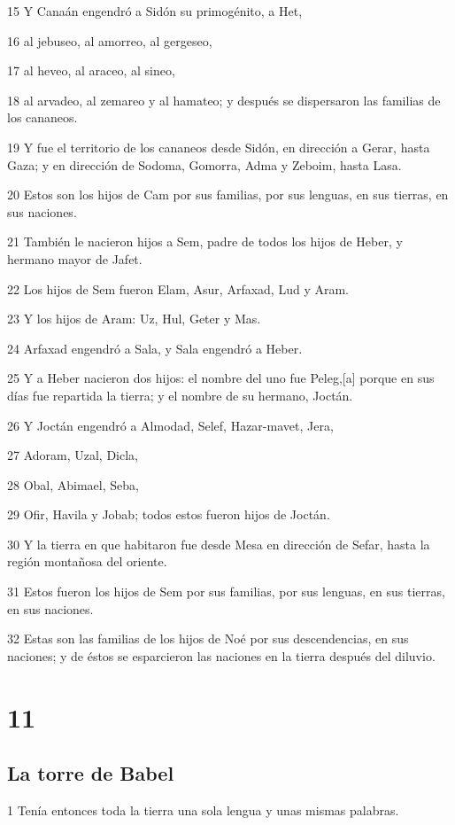 15 Y Canaán engendró a Sidón su primogénito, a Het,

16 al jebuseo, al amorreo, al gergeseo,

17 al heveo, al araceo, al sineo,

18 al arvadeo, al zemareo y al hamateo; y después se dispersaron las familias de los cananeos.

19 Y fue el territorio de los cananeos desde Sidón, en dirección a Gerar, hasta Gaza; y en dirección de Sodoma, Gomorra, Adma y Zeboim, hasta Lasa.

20 Estos son los hijos de Cam por sus familias, por sus lenguas, en sus tierras, en sus naciones.

21 También le nacieron hijos a Sem, padre de todos los hijos de Heber, y hermano mayor de Jafet.

22 Los hijos de Sem fueron Elam, Asur, Arfaxad, Lud y Aram.

23 Y los hijos de Aram: Uz, Hul, Geter y Mas.

24 Arfaxad engendró a Sala, y Sala engendró a Heber.

25 Y a Heber nacieron dos hijos: el nombre del uno fue Peleg,[a] porque en sus días fue repartida la tierra; y el nombre de su hermano, Joctán.

26 Y Joctán engendró a Almodad, Selef, Hazar-mavet, Jera,

27 Adoram, Uzal, Dicla,

28 Obal, Abimael, Seba,

29 Ofir, Havila y Jobab; todos estos fueron hijos de Joctán.

30 Y la tierra en que habitaron fue desde Mesa en dirección de Sefar, hasta la región montañosa del oriente.

31 Estos fueron los hijos de Sem por sus familias, por sus lenguas, en sus tierras, en sus naciones.

32 Estas son las familias de los hijos de Noé por sus descendencias, en sus naciones; y de éstos se esparcieron las naciones en la tierra después del diluvio.

\chapter{11}

\section{La torre de Babel}

1 Tenía entonces toda la tierra una sola lengua y unas mismas palabras.

